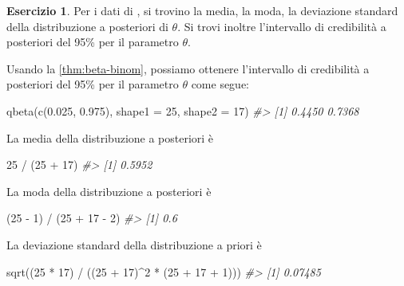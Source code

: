 \documentclass[
  11pt,
]{krantz}
\makeatletter
\newenvironment{Shaded}{\begin{snugshade}}{\end{snugshade}}
\newcommand{\AttributeTok}[1]{\textcolor[rgb]{0.61,0.61,0.61}{#1}}
\newcommand{\CommentTok}[1]{\textcolor[rgb]{0.37,0.37,0.37}{\textit{#1}}}
\newcommand{\DecValTok}[1]{\textcolor[rgb]{0.06,0.06,0.06}{#1}}
\newcommand{\FloatTok}[1]{\textcolor[rgb]{0.06,0.06,0.06}{#1}}
\newcommand{\FunctionTok}[1]{\textcolor[rgb]{0,0,0}{#1}}
\newcommand{\NormalTok}[1]{#1}
\newcommand{\SpecialCharTok}[1]{\textcolor[rgb]{0,0,0}{#1}}
\newenvironment{kframe}{%
\medskip{}
\setlength{\fboxsep}{.8em}
 \def\at@end@of@kframe{}%
 \ifinner\ifhmode%
  \def\at@end@of@kframe{\end{minipage}}%
  \begin{minipage}{\columnwidth}%
 \fi\fi%
 \def\FrameCommand##1{\hskip\@totalleftmargin \hskip-\fboxsep
 \colorbox{shadecolor}{##1}\hskip-\fboxsep
     \hskip-\linewidth \hskip-\@totalleftmargin \hskip\columnwidth}%
 \MakeFramed {\advance\hsize-\width
   \@totalleftmargin\z@ \linewidth\hsize
   \@setminipage}}%
 {\par\unskip\endMakeFramed%
 \at@end@of@kframe}
\renewenvironment{Shaded}{\begin{kframe}}{\end{kframe}}
\theoremstyle{definition}
\theoremstyle{definition}
\theoremstyle{definition}
\newtheorem{exercise}{Esercizio}[chapter]
\theoremstyle{definition}
\theoremstyle{remark}
\makeatother
\begin{document}
\begin{exercise}

Per i dati di \citet{zetschefuture2019}, si trovino la media, la moda, la deviazione standard della distribuzione a posteriori di \(\theta\). Si trovi inoltre l'intervallo di credibilità a posteriori del 95\% per il parametro \(\theta\).

Usando la \ref{thm:beta-binom}, possiamo ottenere l'intervallo di credibilità a posteriori del 95\% per il parametro \(\theta\) come segue:

\begin{Shaded}
\begin{Highlighting}[]
\FunctionTok{qbeta}\NormalTok{(}\FunctionTok{c}\NormalTok{(}\FloatTok{0.025}\NormalTok{, }\FloatTok{0.975}\NormalTok{), }\AttributeTok{shape1 =} \DecValTok{25}\NormalTok{, }\AttributeTok{shape2 =} \DecValTok{17}\NormalTok{)}
\CommentTok{\#\textgreater{} [1] 0.4450 0.7368}
\end{Highlighting}
\end{Shaded}

La media della distribuzione a posteriori è

\begin{Shaded}
\begin{Highlighting}[]
\DecValTok{25} \SpecialCharTok{/}\NormalTok{ (}\DecValTok{25} \SpecialCharTok{+} \DecValTok{17}\NormalTok{)}
\CommentTok{\#\textgreater{} [1] 0.5952}
\end{Highlighting}
\end{Shaded}

La moda della distribuzione a posteriori è

\begin{Shaded}
\begin{Highlighting}[]
\NormalTok{(}\DecValTok{25} \SpecialCharTok{{-}} \DecValTok{1}\NormalTok{) }\SpecialCharTok{/}\NormalTok{ (}\DecValTok{25} \SpecialCharTok{+} \DecValTok{17} \SpecialCharTok{{-}} \DecValTok{2}\NormalTok{)}
\CommentTok{\#\textgreater{} [1] 0.6}
\end{Highlighting}
\end{Shaded}

La deviazione standard della distribuzione a priori è

\begin{Shaded}
\begin{Highlighting}[]
\FunctionTok{sqrt}\NormalTok{((}\DecValTok{25} \SpecialCharTok{*} \DecValTok{17}\NormalTok{) }\SpecialCharTok{/}\NormalTok{ ((}\DecValTok{25} \SpecialCharTok{+} \DecValTok{17}\NormalTok{)}\SpecialCharTok{\^{}}\DecValTok{2} \SpecialCharTok{*}\NormalTok{ (}\DecValTok{25} \SpecialCharTok{+} \DecValTok{17} \SpecialCharTok{+} \DecValTok{1}\NormalTok{)))}
\CommentTok{\#\textgreater{} [1] 0.07485}
\end{Highlighting}
\end{Shaded}

\end{exercise}
\end{document}
